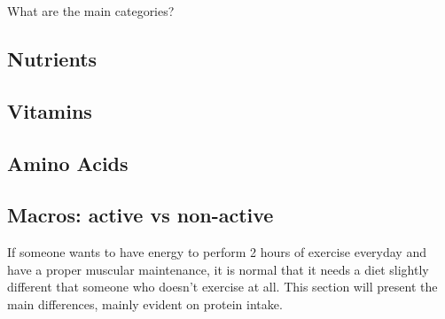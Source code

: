 What are the main categories?

\subsection{Nutrients}

\subsection{Vitamins}

\subsection{Amino Acids}

\subsection{Macros: active vs non-active}
If someone wants to have energy to perform 2 hours of exercise everyday and have a proper muscular maintenance, it is normal that it needs a diet slightly different that someone who doesn't exercise at all. This section will present the main differences, mainly evident on protein intake.